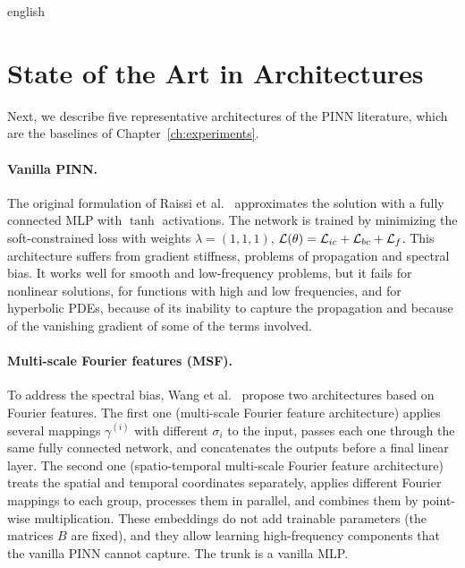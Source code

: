 \documentclass[0000.tex]{subfiles}
\begin{document}
\begin{hyphenrules}{english}
\section{State of the Art in Architectures}\label{sec:architectures}

Next, we describe five representative architectures of the PINN literature, which are the baselines of
Chapter~\ref{ch:experiments}.

\paragraph{Vanilla PINN.}
The original formulation of Raissi et al.~\cite{raissi2019} approximates the solution with a fully connected MLP
with $\tanh$ activations. The network is trained by minimizing the soft-constrained loss with weights
$\lambda=(1,1,1)$, $\mathcal{L}(\theta)=\mathcal{L}_{ic}+\mathcal{L}_{bc}+\mathcal{L}_f$. This architecture suffers from gradient
stiffness, problems of propagation and spectral bias. It works well for smooth and low-frequency
problems, but it fails for nonlinear solutions, for functions with high and low frequencies, and for
hyperbolic PDEs, because of its inability to capture the propagation and because of the vanishing gradient
of some of the terms involved.

\paragraph{Multi-scale Fourier features (MSF).}
To address the spectral bias, Wang et al.~\cite{wang2021eigenvector} propose two architectures based on Fourier
features. The first one (multi-scale Fourier feature architecture) applies several mappings
$\gamma^{(i)}$ with different $\sigma_i$ to the input, passes each one through the same fully connected
network, and concatenates the outputs before a final linear layer. The second one (spatio-temporal
multi-scale Fourier feature architecture) treats the spatial and temporal coordinates separately, applies
different Fourier mappings to each group, processes them in parallel, and combines them by point-wise
multiplication. These embeddings do not add trainable parameters (the matrices $B$ are fixed), and they
allow learning high-frequency components that the vanilla PINN cannot capture. The trunk is a vanilla MLP.


\end{hyphenrules}
\end{document}
